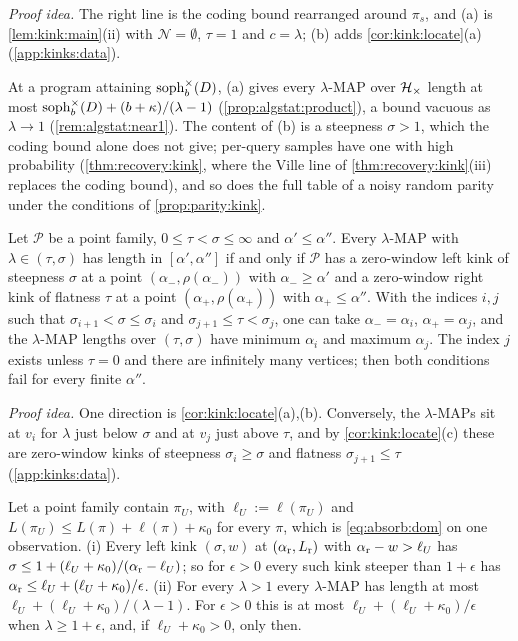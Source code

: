 \emph{Proof idea.} The right line is the coding bound rearranged around $\pi_s$, and (a) is \cref{lem:kink:main}(ii) with $\mathcal N=\emptyset$, $\tau=1$ and $c=\lambda$; (b) adds \cref{cor:kink:locate}(a) (\cref{app:kinks:data}).

At a program attaining $\operatorname{soph}^{\times}_b(D)$, (a) gives every $\lambda$-MAP over $\mathcal{H}_{\times}$ length at most $\operatorname{soph}^{\times}_b(D)+(b+\kappa)/(\lambda-1)$ (\cref{prop:algstat:product}), a bound vacuous as $\lambda\to1$ (\cref{rem:algstat:near1}). The content of (b) is a steepness $\sigma>1$, which the coding bound alone does not give; per-query samples have one with high probability (\cref{thm:recovery:kink}, where the Ville line of \cref{thm:recovery:kink}(iii) replaces the coding bound), and so does the full table of a noisy random parity under the conditions of \cref{prop:parity:kink}.

\begin{theorem}\label{thm:kink:converse}
Let $\mathcal P$ be a point family, $0\le\tau<\sigma\le\infty$ and $\alpha'\le\alpha''$. Every $\lambda$-MAP with $\lambda\in(\tau,\sigma)$ has length in $[\alpha',\alpha'']$ if and only if $\mathcal P$ has a zero-window left kink of steepness $\sigma$ at a point $(\alpha_-,\rho(\alpha_-))$ with $\alpha_-\ge\alpha'$ and a zero-window right kink of flatness $\tau$ at a point $(\alpha_+,\rho(\alpha_+))$ with $\alpha_+\le\alpha''$. With the indices $i,j$ such that $\sigma_{i+1}<\sigma\le\sigma_i$ and $\sigma_{j+1}\le\tau<\sigma_j$, one can take $\alpha_-=\alpha_i$, $\alpha_+=\alpha_j$, and the $\lambda$-MAP lengths over $(\tau,\sigma)$ have minimum $\alpha_i$ and maximum $\alpha_j$. The index $j$ exists unless $\tau=0$ and there are infinitely many vertices; then both conditions fail for every finite $\alpha''$.
\end{theorem}

\emph{Proof idea.} One direction is \cref{cor:kink:locate}(a),(b). Conversely, the $\lambda$-MAPs sit at $v_i$ for $\lambda$ just below $\sigma$ and at $v_j$ just above $\tau$, and by \cref{cor:kink:locate}(c) these are zero-window kinks of steepness $\sigma_i\ge\sigma$ and flatness $\sigma_{j+1}\le\tau$ (\cref{app:kinks:data}).

\begin{proposition}\label{prop:kink:universal}
Let a point family contain $\pi_U$, with $\ell_U:=\ell(\pi_U)$ and $L(\pi_U)\le L(\pi)+\ell(\pi)+\kappa_0$ for every $\pi$, which is \eqref{eq:absorb:dom} on one observation.
(i) Every left kink $(\sigma,w)$ at $(\alpha_{\rm r},L_{\rm r})$ with $\alpha_{\rm r}-w>\ell_U$ has $\sigma\le1+(\ell_U+\kappa_0)/(\alpha_{\rm r}-\ell_U)$; so for $\epsilon>0$ every such kink steeper than $1+\epsilon$ has $\alpha_{\rm r}\le\ell_U+(\ell_U+\kappa_0)/\epsilon$.
(ii) For every $\lambda>1$ every $\lambda$-MAP has length at most $\ell_U+(\ell_U+\kappa_0)/(\lambda-1)$. For $\epsilon>0$ this is at most $\ell_U+(\ell_U+\kappa_0)/\epsilon$ when $\lambda\ge1+\epsilon$, and, if $\ell_U+\kappa_0>0$, only then.
\end{proposition}

